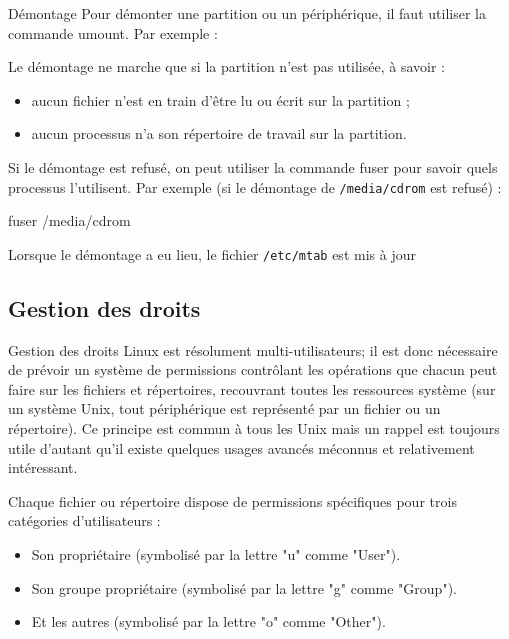 \documentclass[10pt]{beamer}
\begin{document}
\begin{frame}[fragile]{Démontage}
Pour  démonter  une  partition  ou un  périphérique,  il faut  utiliser  la commande
\alert{umount}. 
Par exemple :
 

\pause

Le démontage ne marche que si la partition n'est pas utilisée, à savoir :
\begin{itemize} 
\item aucun fichier n'est en train d'être lu ou écrit sur la partition ; 
\item aucun processus n'a son répertoire de travail sur la partition. 
\end{itemize}
\pause
Si le démontage est refusé, on peut utiliser la commande fuser pour savoir quels
processus l'utilisent. Par exemple (si le démontage de \texttt{/media/cdrom} est refusé) :
\begin{mylisting}
 fuser /media/cdrom 
\end{mylisting}
\pause

Lorsque le démontage a eu lieu, le fichier \texttt{/etc/mtab} est mis à jour
\end{frame}

\subsection{Gestion des droits}
\begin{frame}{Gestion des droits}
Linux est résolument multi-utilisateurs; il est donc nécessaire de prévoir un système de permissions contrôlant les opérations que chacun peut faire sur les fichiers et répertoires, recouvrant toutes les ressources système (sur un système Unix, tout périphérique est représenté par un fichier ou un répertoire). Ce principe est commun à tous les Unix mais un rappel est toujours utile d'autant qu'il existe quelques usages avancés méconnus et relativement intéressant.

Chaque fichier ou répertoire dispose de permissions spécifiques pour trois catégories d'utilisateurs :

\begin{itemize}
\item Son propriétaire (symbolisé par la lettre "\alert{u}" comme "\alert{User}").
\item Son groupe propriétaire (symbolisé par la lettre "\alert{g}" comme "\alert{Group}").
\item Et les autres (symbolisé par la lettre "\alert{o}" comme "\alert{Other}").
\end{itemize}
\end{frame}
\end{document}
